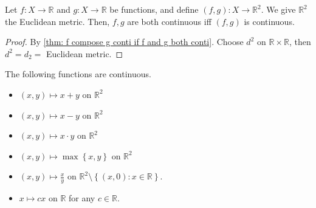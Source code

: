 \begin{lemma}
    Let \(f: X \to \mathbb{R} \) and \(g: X \to \mathbb{R} \) be functions, and define \((f, g): X \to \mathbb{R}^2 \). We give \(\mathbb{R} ^2\) the Euclidean metric. Then, \(f, g\) are both continuous iff \((f, g)\) is continuous.       
\end{lemma}
\begin{proof}
    By \autoref{thm: f compose g conti if f and g both conti}. Choose \(d^2\) on \(\mathbb{R} \times \mathbb{R} \), then \(d^2 = d_2 = \) Euclidean metric.    
\end{proof}

\begin{lemma}
    The following functions are continuous. 
    \begin{itemize}
        \item \((x, y) \mapsto x + y\) on \(\mathbb{R} ^2\) 
        \item \((x, y) \mapsto x - y\) on \(\mathbb{R} ^2\) 
        \item \((x, y) \mapsto x \cdot y\) on \(\mathbb{R} ^2\)
        \item \((x, y) \mapsto \max \left\{ x, y \right\} \) on \(\mathbb{R} ^2\) 
        \item \((x, y) \mapsto \frac{x}{y}\) on \(\mathbb{R} ^2 \setminus \left\{ (x, 0) : x \in \mathbb{R}  \right\} \). 
        \item \(x \mapsto cx\) on \(\mathbb{R} \) for any \(c \in \mathbb{R} \).         
    \end{itemize}
\end{lemma}
